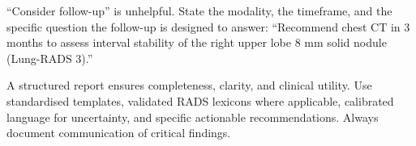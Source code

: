 \begin{pearlbox}
``Consider follow-up'' is unhelpful. State the modality, the timeframe, and the specific question the follow-up is designed to answer: ``Recommend chest CT in 3 months to assess interval stability of the right upper lobe 8 mm solid nodule (Lung-RADS 3).''
\end{pearlbox}

\begin{pearlbox}[Impression:]
A structured report ensures completeness, clarity, and clinical utility. Use standardised templates, validated RADS lexicons where applicable, calibrated language for uncertainty, and specific actionable recommendations. Always document communication of critical findings.
\end{pearlbox}

\clearpage
